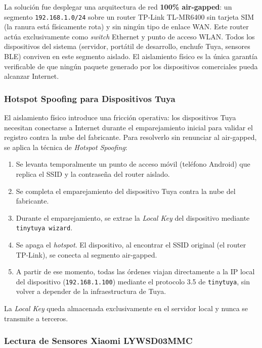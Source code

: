 La solución fue desplegar una arquitectura de red \textbf{100\% air-gapped}: un segmento \texttt{192.168.1.0/24} sobre un router TP-Link TL-MR6400 sin tarjeta SIM (la ranura está físicamente rota) y sin ningún tipo de enlace WAN. Este router actúa exclusivamente como \textit{switch} Ethernet y punto de acceso WLAN. Todos los dispositivos del sistema (servidor, portátil de desarrollo, enchufe Tuya, sensores BLE) conviven en este segmento aislado. El aislamiento físico es la única garantía verificable de que ningún paquete generado por los dispositivos comerciales pueda alcanzar Internet.

\subsubsection{Hotspot Spoofing para Dispositivos Tuya}

El aislamiento físico introduce una fricción operativa: los dispositivos Tuya necesitan conectarse a Internet durante el emparejamiento inicial para validar el registro contra la nube del fabricante. Para resolverlo sin renunciar al air-gapped, se aplica la técnica de \textit{Hotspot Spoofing}:

\begin{enumerate}
    \item Se levanta temporalmente un punto de acceso móvil (teléfono Android) que replica el SSID y la contraseña del router aislado.
    \item Se completa el emparejamiento del dispositivo Tuya contra la nube del fabricante.
    \item Durante el emparejamiento, se extrae la \textit{Local Key} del dispositivo mediante \texttt{tinytuya wizard}.
    \item Se apaga el \textit{hotspot}. El dispositivo, al encontrar el SSID original (el router TP-Link), se conecta al segmento air-gapped.
    \item A partir de ese momento, todas las órdenes viajan directamente a la IP local del dispositivo (\texttt{192.168.1.100}) mediante el protocolo 3.5 de \texttt{tinytuya}, sin volver a depender de la infraestructura de Tuya.
\end{enumerate}

La \textit{Local Key} queda almacenada exclusivamente en el servidor local y nunca se transmite a terceros.

\subsubsection{Lectura de Sensores Xiaomi LYWSD03MMC}


